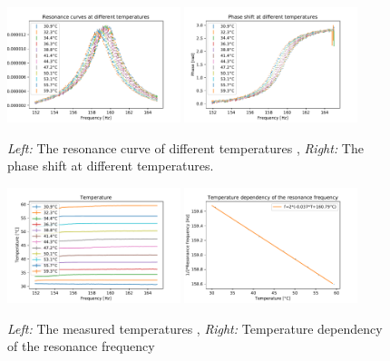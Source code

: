\begin{figure}[h]
	\centering
	\includegraphics[width=0.45\textwidth]{figures/ResonanceTemp.pdf}
	\includegraphics[width=0.45\textwidth]{figures/PhaseTemp.pdf}
	\caption{\emph{Left:} The resonance curve of different temperatures , \emph{Right:} The phase shift at different temperatures.}
	\label{fig12}
\end{figure}

\begin{figure}[h]
	\centering
	\includegraphics[width=0.45\textwidth]{figures/TempTemp.pdf}
	\includegraphics[width=0.45\textwidth]{figures/TempFreq.pdf}
	\caption{\emph{Left:} The measured temperatures , \emph{Right:} Temperature dependency of the resonance frequency }
	\label{fig13}
\end{figure}







